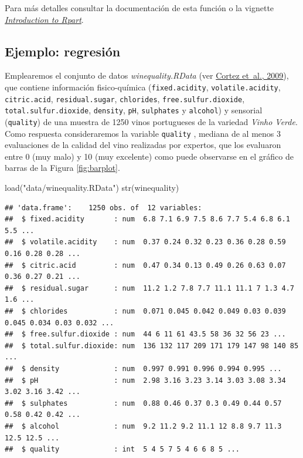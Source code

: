 \documentclass[
  spanish,
]{book}
\newenvironment{Shaded}{\begin{snugshade}}{\end{snugshade}}
\newcommand{\FunctionTok}[1]{\textcolor[rgb]{0.00,0.00,0.00}{#1}}
\newcommand{\NormalTok}[1]{#1}
\newcommand{\StringTok}[1]{\textcolor[rgb]{0.31,0.60,0.02}{#1}}
\theoremstyle{break}
\theoremstyle{definition}
\theoremstyle{definition}
\theoremstyle{definition}
\theoremstyle{definition}
\theoremstyle{remark}
\begin{document}
Para más detalles consultar la documentación de esta función o la vignette \href{https://cran.r-project.org/web/packages/rpart/vignettes/longintro.pdf}{\emph{Introduction to Rpart}}.

\hypertarget{ejemplo-regresiuxf3n}{%
\subsection{Ejemplo: regresión}\label{ejemplo-regresiuxf3n}}

Emplearemos el conjunto de datos \emph{winequality.RData} (ver \protect\hyperlink{ref-cortez2009modeling}{Cortez et~al., 2009}), que contiene información fisico-química
(\texttt{fixed.acidity}, \texttt{volatile.acidity}, \texttt{citric.acid}, \texttt{residual.sugar}, \texttt{chlorides}, \texttt{free.sulfur.dioxide},
\texttt{total.sulfur.dioxide}, \texttt{density}, \texttt{pH}, \texttt{sulphates} y \texttt{alcohol}) y sensorial (\texttt{quality})
de una muestra de 1250 vinos portugueses de la variedad \emph{Vinho Verde}.
Como respuesta consideraremos la variable \texttt{quality} , mediana de al menos 3 evaluaciones de la calidad del vino realizadas por expertos, que los evaluaron entre 0 (muy malo) y 10 (muy excelente) como puede observarse en el gráfico de barras de la Figura \ref{fig:barplot}.

\begin{Shaded}
\begin{Highlighting}[]
\FunctionTok{load}\NormalTok{(}\StringTok{"data/winequality.RData"}\NormalTok{)}
\FunctionTok{str}\NormalTok{(winequality)}
\end{Highlighting}
\end{Shaded}

\begin{verbatim}
## 'data.frame':    1250 obs. of  12 variables:
##  $ fixed.acidity       : num  6.8 7.1 6.9 7.5 8.6 7.7 5.4 6.8 6.1 5.5 ...
##  $ volatile.acidity    : num  0.37 0.24 0.32 0.23 0.36 0.28 0.59 0.16 0.28 0.28 ...
##  $ citric.acid         : num  0.47 0.34 0.13 0.49 0.26 0.63 0.07 0.36 0.27 0.21 ...
##  $ residual.sugar      : num  11.2 1.2 7.8 7.7 11.1 11.1 7 1.3 4.7 1.6 ...
##  $ chlorides           : num  0.071 0.045 0.042 0.049 0.03 0.039 0.045 0.034 0.03 0.032 ...
##  $ free.sulfur.dioxide : num  44 6 11 61 43.5 58 36 32 56 23 ...
##  $ total.sulfur.dioxide: num  136 132 117 209 171 179 147 98 140 85 ...
##  $ density             : num  0.997 0.991 0.996 0.994 0.995 ...
##  $ pH                  : num  2.98 3.16 3.23 3.14 3.03 3.08 3.34 3.02 3.16 3.42 ...
##  $ sulphates           : num  0.88 0.46 0.37 0.3 0.49 0.44 0.57 0.58 0.42 0.42 ...
##  $ alcohol             : num  9.2 11.2 9.2 11.1 12 8.8 9.7 11.3 12.5 12.5 ...
##  $ quality             : int  5 4 5 7 5 4 6 6 8 5 ...
\end{verbatim}
\end{document}
